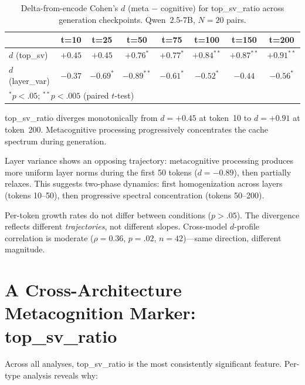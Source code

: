 \documentclass[11pt,a4paper]{article}
\begin{document}
\begin{table}[H]
\centering
\caption{Delta-from-encode Cohen's $d$ (meta $-$ cognitive) for top\_sv\_ratio across generation checkpoints. Qwen~2.5-7B, $N = 20$ pairs.}
\label{tab:study3_trajectory}
\begin{tabular}{lccccccc}
\toprule
 & \textbf{t=10} & \textbf{t=25} & \textbf{t=50} & \textbf{t=75} & \textbf{t=100} & \textbf{t=150} & \textbf{t=200} \\
\midrule
$d$ (top\_sv)    & $+0.45$ & $+0.45$ & $+0.76^*$ & $+0.77^*$ & $+0.84^{**}$ & $+0.87^{**}$ & $+0.91^{**}$ \\
$d$ (layer\_var) & $-0.37$ & $-0.69^*$ & $-0.89^{**}$ & $-0.61^*$ & $-0.52^*$ & $-0.44$ & $-0.56^*$ \\
\bottomrule
\multicolumn{8}{l}{\footnotesize $^*p < .05$; $^{**}p < .005$ (paired $t$-test)}
\end{tabular}
\end{table}

top\_sv\_ratio diverges monotonically from $d = +0.45$ at token~10 to
$d = +0.91$ at token~200. Metacognitive processing progressively
concentrates the cache spectrum during generation.

Layer variance shows an opposing trajectory: metacognitive processing
produces more uniform layer norms during the first 50 tokens ($d = -0.89$),
then partially relaxes. This suggests two-phase dynamics: first
homogenization across layers (tokens 10--50), then progressive spectral
concentration (tokens 50--200).

Per-token growth rates do not differ between conditions ($p > .05$). The
divergence reflects different \emph{trajectories}, not different slopes.
Cross-model $d$-profile correlation is moderate ($\rho = 0.36$, $p = .02$,
$n = 42$)---same direction, different magnitude.

\section{A Cross-Architecture Metacognition Marker: top\_sv\_ratio}

Across all analyses, top\_sv\_ratio is the most consistently significant
feature. Per-type analysis reveals why:
\end{document}
